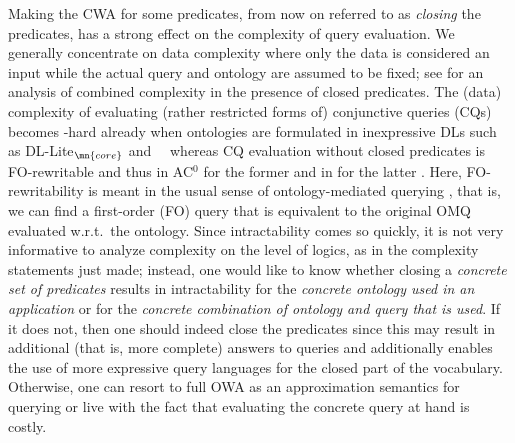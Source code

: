 \documentclass{lmcs}
\theoremstyle{definition}
\begin{document}
Making the CWA for some predicates, from now on referred to as
\emph{closing} the predicates, has a strong effect on the complexity of
query evaluation. We generally concentrate on data complexity
where only the data is considered an input while the actual query and
ontology are assumed to be fixed; see 
\cite{DBLP:conf/kr/NgoOS16} for an analysis of combined complexity in
the presence of closed predicates.
The (data) complexity of evaluating (rather restricted forms of)
conjunctive queries (CQs) becomes \conp-hard already when ontologies
are formulated in inexpressive DLs such as DL-Lite$_{\mn{core}}$
and~\EL~\cite{franconi11query} whereas CQ evaluation without closed
predicates is FO-rewritable and thus in AC$^0$ for the former and in
\PTime for the latter
\cite{CDLLR07,DBLP:journals/jair/ArtaleCKZ09,hustadt2005data}.  Here,
FO-rewritability is meant in the usual sense of ontology-mediated
querying \cite{CDLLR07,DBLP:conf/rweb/KontchakovZ14,DBLP:conf/ijcai/BienvenuLW13,DBLP:conf/ijcai/Bienvenu0LW16}, that is, we can find a first-order
(FO) query that is equivalent to the original OMQ evaluated w.r.t.\
the ontology. Since intractability comes so quickly, it is not very
informative to analyze complexity on the level of logics, as in the
complexity statements just made; instead, one would like to know
whether closing a \emph{concrete set of predicates} results in
intractability for the \emph{concrete ontology used in an application}
or for the \emph{concrete combination of ontology and query that is
  used}. If it does not, then one should indeed close the predicates
since this may result in additional (that is, more complete) answers
to queries and additionally enables the use of more expressive query
languages for the closed part of the vocabulary. Otherwise, one can
resort to full OWA as an approximation semantics for querying or live
with the fact that evaluating the concrete query at hand is costly.
\end{document}
